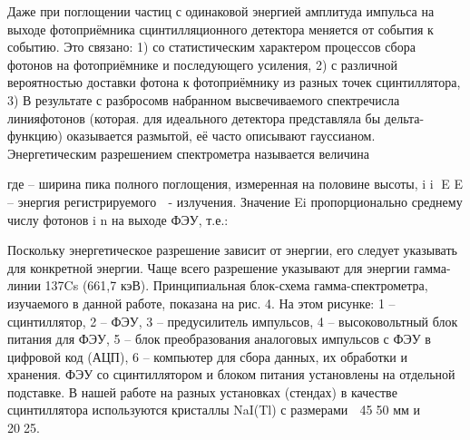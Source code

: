 Даже при поглощении частиц с одинаковой энергией амплитуда импульса на выходе
фотоприёмника сцинтилляционного детектора меняется от события к событию. Это
связано: 1) со статистическим характером процессов сбора фотонов на
фотоприёмнике и последующего усиления, 2) с различной вероятностью доставки
фотона к фотоприёмнику из разных точек сцинтиллятора, 3) В результате с
разбросомв набранном высвечиваемого спектречисла линияфотонов (которая. для
идеального детектора представляла бы дельта-функцию) оказывается размытой, её
часто описывают гауссианом. Энергетическим разрешением спектрометра называется
величина

где – ширина пика полного поглощения, измеренная на половине высоты, i i E E –
энергия регистрируемого  - излучения. Значение Ei пропорционально среднему
числу фотонов i n на выходе ФЭУ, т.е.:

Поскольку энергетическое разрешение зависит от энергии, его следует указывать
для конкретной энергии. Чаще всего разрешение указывают для энергии гамма-линии
137Cs (661,7 кэВ). Принципиальная блок-схема гамма-спектрометра, изучаемого в
данной работе, показана на рис. 4. На этом рисунке: 1 – сцинтиллятор, 2 – ФЭУ, 3
– предусилитель импульсов, 4 – высоковольтный блок питания для ФЭУ, 5 – блок
преобразования аналоговых импульсов с ФЭУ в цифровой код (АЦП), 6 – компьютер
для сбора данных, их обработки и хранения. ФЭУ со сцинтиллятором и блоком
питания установлены на отдельной подставке. В нашей работе на разных установках
(стендах) в качестве сцинтиллятора используются кристаллы NaI(Tl) с размерами 
4550 мм и  2025.
